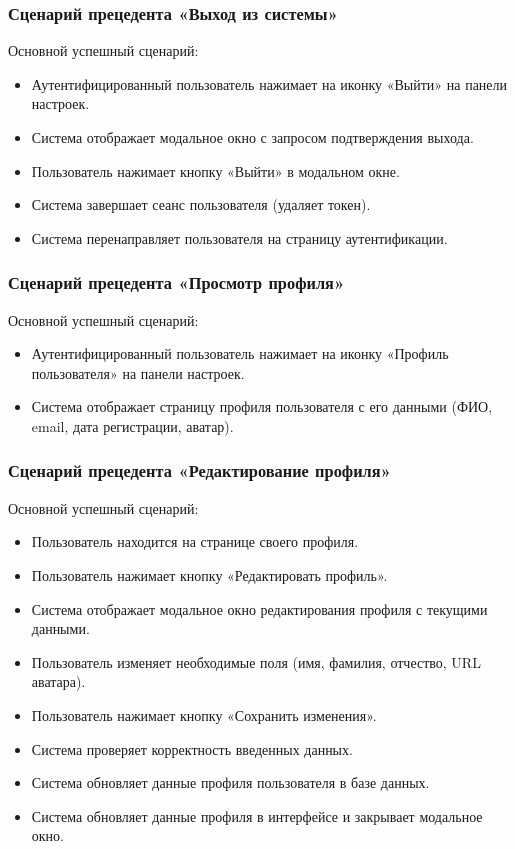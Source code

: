 \subsubsection{Сценарий прецедента «Выход из системы»}
Основной успешный сценарий:
\begin{itemize}
	\item Аутентифицированный пользователь нажимает на иконку «Выйти» на панели настроек.
	\item Система отображает модальное окно с запросом подтверждения выхода.
	\item Пользователь нажимает кнопку «Выйти» в модальном окне.
	\item Система завершает сеанс пользователя (удаляет токен).
	\item Система перенаправляет пользователя на страницу аутентификации.
\end{itemize}

\subsubsection{Сценарий прецедента «Просмотр профиля»}
Основной успешный сценарий:
\begin{itemize}
	\item Аутентифицированный пользователь нажимает на иконку «Профиль пользователя» на панели настроек.
	\item Система отображает страницу профиля пользователя с его данными (ФИО, email, дата регистрации, аватар).
\end{itemize}

\subsubsection{Сценарий прецедента «Редактирование профиля»}
Основной успешный сценарий:
\begin{itemize}
	\item Пользователь находится на странице своего профиля.
	\item Пользователь нажимает кнопку «Редактировать профиль».
	\item Система отображает модальное окно редактирования профиля с текущими данными.
	\item Пользователь изменяет необходимые поля (имя, фамилия, отчество, URL аватара).
	\item Пользователь нажимает кнопку «Сохранить изменения».
	\item Система проверяет корректность введенных данных.
	\item Система обновляет данные профиля пользователя в базе данных.
	\item Система обновляет данные профиля в интерфейсе и закрывает модальное окно.
\end{itemize}

